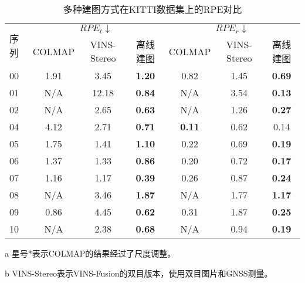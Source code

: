\begin{table}
\centering
\begin{threeparttable}
\caption{多种建图方式在KITTI数据集上的RPE\textdownarrow{}对比}
\begin{tabular}{lcccccc}
\toprule
\multirow{2}{*}{序列} & \multicolumn{3}{c}{$RPE_t \downarrow$}              & \multicolumn{3}{c}{$RPE_r\downarrow$}                    \\ \cline{2-7} 
                    & COLMAP & VINS-Stereo & 离线建图          & COLMAP       & VINS-Stereo & 离线建图  \\
\midrule
00                  & 1.91    & 3.45        & \cellcolor[HTML]{FFCCC9}\textbf{1.20} & 0.82          & 1.45        & \cellcolor[HTML]{FFCCC9}\textbf{0.69} \\
01                  & N/A     & 12.18       & \cellcolor[HTML]{FFCCC9}\textbf{0.84} & N/A           & 3.54        & \cellcolor[HTML]{FFCCC9}\textbf{0.13} \\
02                  & N/A     & 2.65        & \cellcolor[HTML]{FFCCC9}\textbf{0.63} & N/A           & 1.26        & \cellcolor[HTML]{FFCCC9}\textbf{0.27} \\
04                  & 4.12    & 2.71        & \cellcolor[HTML]{FFCCC9}\textbf{0.71} & \cellcolor[HTML]{FFCCC9}\textbf{0.11} & 0.62        & 0.14          \\
05                  & 1.75    & 1.41        & \cellcolor[HTML]{FFCCC9}\textbf{1.10} & 0.22          & 0.69        & \cellcolor[HTML]{FFCCC9}\textbf{0.19} \\
06                  & 1.37    & 1.33        & \cellcolor[HTML]{FFCCC9}\textbf{0.86} & 0.20          & 0.72        & \cellcolor[HTML]{FFCCC9}\textbf{0.17} \\
07                  & 1.16    & 1.17        & \cellcolor[HTML]{FFCCC9}\textbf{0.39} & 0.26          & 0.87        & \cellcolor[HTML]{FFCCC9}\textbf{0.24} \\
08                  & N/A     & 3.46        & \cellcolor[HTML]{FFCCC9}\textbf{1.87} & N/A           & 1.77        & \cellcolor[HTML]{FFCCC9}\textbf{1.17} \\
09                  & 0.86    & 4.45        & \cellcolor[HTML]{FFCCC9}\textbf{0.62} & 0.31          & 1.87        & \cellcolor[HTML]{FFCCC9}\textbf{0.25} \\
10                  & N/A     & 2.38        & \cellcolor[HTML]{FFCCC9}\textbf{0.68} & N/A           & 0.94        & \cellcolor[HTML]{FFCCC9}\textbf{0.19} \\ \bottomrule
\end{tabular}
\label{tab:map_rpe}
\begin{tablenotes}
  \item [a] 星号*表示COLMAP的结果经过了尺度调整。
  \item [b] VINS-Stereo表示VINS-Fusion的双目版本，使用双目图片和GNSS测量。
\end{tablenotes}
\end{threeparttable}
\end{table}

